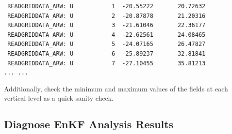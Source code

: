 \begin{enumerate}
\begin{footnotesize}
\begin{verbatim}
 READGRIDDATA_ARW: U           1  -20.55222       20.72632
 READGRIDDATA_ARW: U           2  -20.87878       21.20316
 READGRIDDATA_ARW: U           3  -21.61046       22.36177
 READGRIDDATA_ARW: U           4  -22.62561       24.08465
 READGRIDDATA_ARW: U           5  -24.07165       26.47827
 READGRIDDATA_ARW: U           6  -25.89237       32.81841
 READGRIDDATA_ARW: U           7  -27.10455       35.81213
... ...
\end{verbatim}
\end{footnotesize}

Additionally, check the minimum and maximum values of the fields at each vertical level as a quick sanity check.

\end{enumerate}

\subsection{Diagnose EnKF Analysis Results}


